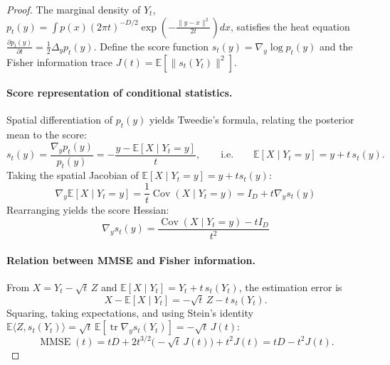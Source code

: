 \documentclass{article}
\theoremstyle{plain}
\theoremstyle{definition}
\theoremstyle{remark}
\begin{document}
    \begin{proof}
    The marginal density of $Y_t$, $p_t(y) = \int p(x) (2\pi t)^{-D/2} \exp\left(-\frac{\|y-x\|^2}{2t}\right) dx$, satisfies the heat equation $\frac{\partial p_t(y)}{\partial t} = \frac{1}{2} \Delta_y p_t(y)$. Define the score function $s_t(y) = \nabla_y \log p_t(y)$ and the Fisher information trace $J(t) = \mathbb{E}\left[\|s_t(Y_t)\|^2\right]$.
    
    \paragraph{Score representation of conditional statistics.}
    Spatial differentiation of $p_t(y)$ yields Tweedie's formula, relating the posterior mean to the score:
    $$ s_t(y) = \frac{\nabla_y p_t(y)}{p_t(y)} = -\frac{y - \mathbb{E}[X \mid Y_t = y]}{t}, \qquad \text{i.e.} \qquad \mathbb{E}[X \mid Y_t = y] = y + t\, s_t(y). $$
    Taking the spatial Jacobian of $\mathbb{E}[X \mid Y_t = y] = y + t s_t(y)$:
    $$ \nabla_y \mathbb{E}[X \mid Y_t = y] = \frac{1}{t} \operatorname{Cov}(X \mid Y_t = y) = I_D + t \nabla_y s_t(y) $$
    Rearranging yields the score Hessian:
    $$ \nabla_y s_t(y) = \frac{\operatorname{Cov}(X \mid Y_t = y) - t I_D}{t^2} $$
    
    \paragraph{Relation between MMSE and Fisher information.}

    From $X = Y_t - \sqrt{t}\,Z$ and $\mathbb{E}[X\mid Y_t] = Y_t + t\,s_t(Y_t)$, the estimation error is
    $$ X - \mathbb{E}[X\mid Y_t] = -\sqrt{t}\,Z - t\,s_t(Y_t). $$
    Squaring, taking expectations, and using Stein's identity
    $\mathbb{E}\langle Z, s_t(Y_t)\rangle = \sqrt{t}\,\mathbb{E}[\operatorname{tr}\nabla_y s_t(Y_t)] = -\sqrt{t}\,J(t)$:
    $$ \operatorname{MMSE}(t) = tD + 2t^{3/2}\big(-\sqrt{t}\,J(t)\big) + t^2 J(t) = tD - t^2 J(t). $$
    

\end{proof}
\end{document}
